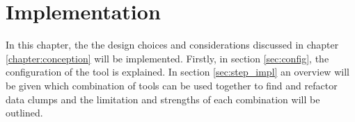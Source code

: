 \chapter{Implementation}\label{chapter:implementation}

In this chapter, the the design choices and considerations discussed in chapter \ref{chapter:conception} will be implemented. Firstly, in section \ref{sec:config}, the configuration of the tool is explained. In section \ref{sec:step_impl} an overview will be given which combination of tools can be used together to find and refactor data clumps and the limitation and strengths of each combination will be outlined. 





